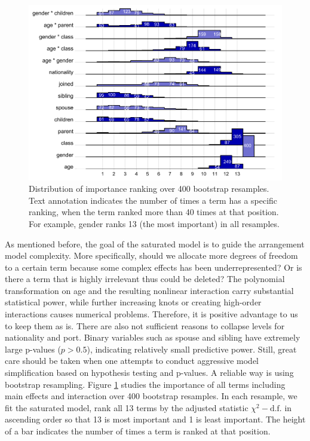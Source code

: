 \documentclass[]{interact}
\theoremstyle{plain}%
\theoremstyle{definition}
\theoremstyle{remark}
\begin{document}
\begin{figure}

{\centering \includegraphics{titanic-survival_files/figure-latex/predictor-ranking-1} 

}

\caption{Distribution of importance ranking over 400 bootstrap resamples. Text annotation indicates the number of times a term has a specific ranking, when the term ranked more than 40 times at that position. For example, gender ranks 13 (the most important) in all resamples.}\label{fig:predictor-ranking}
\end{figure}



As mentioned before, the goal of the saturated model is to guide the arrangement model complexity. More specifically, should we allocate more degrees of freedom to a certain term because some complex effects has been underrepresented? Or is there a term that is highly irrelevant thus could be deleted? The polynomial transformation on age and the resulting nonlinear interaction carry substantial statistical power, while further increasing knots or creating high-order interactions causes numerical problems. Therefore, it is positive advantage to us to keep them as is. There are also not sufficient reasons to collapse levels for nationality and port. Binary variables such as spouse and sibling have extremely large p-values (\(p > 0.5\)), indicating relatively small predictive power. Still, great care should be taken when one attempts to conduct aggressive model simplification based on hypothesis testing and p-values. A reliable way is using bootstrap resampling. Figure \ref{fig:predictor-ranking} studies the importance of all terms including main effects and interaction over 400 bootstrap resamples. In each resample, we fit the saturated model, rank all 13 terms by the adjusted statistic \(\chi^2 - \text{d.f.}\) in ascending order so that 13 is most important and 1 is least important. The height of a bar indicates the number of times a term is ranked at that position.
\end{document}
